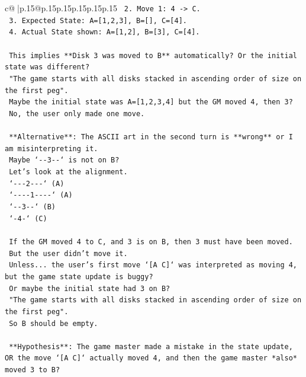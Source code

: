 \documentclass{article}
\begin{document}
{\begin{supertabular}{c@{$\;$}|p{.15\linewidth}@{}p{.15\linewidth}p{.15\linewidth}p{.15\linewidth}p{.15\linewidth}p{.15\linewidth}}
{{{\texttt{                2. Move 1: 4 {-}> C.} \\
\texttt{                3. Expected State: A={[}1,2,3{]}, B={[}{]}, C={[}4{]}.} \\
\texttt{                4. Actual State shown: A={[}1,2{]}, B={[}3{]}, C={[}4{]}.} \\
\\ 
\texttt{                This implies **Disk 3 was moved to B** automatically? Or the initial state was different?} \\
\texttt{                "The game starts with all disks stacked in ascending order of size on the first peg".} \\
\texttt{                Maybe the initial state was A={[}1,2,3,4{]} but the GM moved 4, then 3?} \\
\texttt{                No, the user only made one move.} \\
\\ 
\texttt{                **Alternative**: The ASCII art in the second turn is **wrong** or I am misinterpreting it.} \\
\texttt{                Maybe `{-}{-}3{-}{-}` is not on B?} \\
\texttt{                Let's look at the alignment.} \\
\texttt{                `{-}{-}{-}2{-}{-}{-}` (A)} \\
\texttt{                `{-}{-}{-}{-}1{-}{-}{-}{-}` (A)} \\
\texttt{                `{-}{-}3{-}{-}` (B)} \\
\texttt{                `{-}4{-}` (C)} \\
\\ 
\texttt{                If the GM moved 4 to C, and 3 is on B, then 3 must have been moved.} \\
\texttt{                But the user didn't move it.} \\
\texttt{                Unless... the user's first move `{[}A C{]}` was interpreted as moving 4, but the game state update is buggy?} \\
\texttt{                Or maybe the initial state had 3 on B?} \\
\texttt{                "The game starts with all disks stacked in ascending order of size on the first peg".} \\
\texttt{                So B should be empty.} \\
\\ 
\texttt{                **Hypothesis**: The game master made a mistake in the state update, OR the move `{[}A C{]}` actually moved 4, and then the game master *also* moved 3 to B?} \\
}}}
\end{supertabular}}
\end{document}
